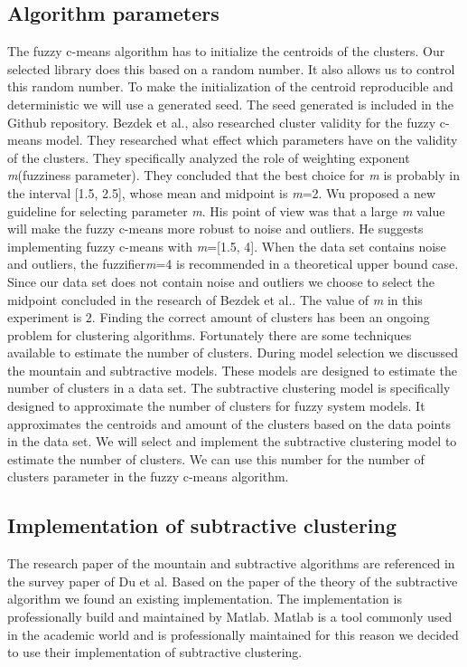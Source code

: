 \documentclass[../../main]{subfiles}
\begin{document}
\subsection{Algorithm parameters}
The fuzzy c-means algorithm has to initialize the centroids of the clusters.
Our selected library does this based on a random number.
It also allows us to control this random number.
To make the initialization of the centroid reproducible and deterministic we will use a generated seed.
The seed generated is included in the Github repository\cite{rbasarat-repo}.
\newline
Bezdek et al., also researched cluster validity for the fuzzy c-means model\cite{Bezdek1995OnModel}.
They researched what effect which parameters have on the validity of the clusters.
They specifically analyzed the role of weighting exponent \textit{m}(fuzziness parameter).
They concluded that the best choice for \textit{m} is probably in the interval [1.5, 2.5], whose mean and midpoint is \textit{m}=2.
Wu proposed a new guideline for selecting parameter \textit{m}\cite{Wu2012}.
His point of view was that a large \textit{m} value will make the fuzzy c-means more robust to noise and outliers.
He suggests implementing fuzzy c-means with \textit{m}=[1.5, 4].
When the data set contains noise and outliers, the fuzzifier\textit{m}=4 is recommended in a theoretical upper bound case.
Since our data set does not contain noise and outliers we choose to select the midpoint concluded in the research of Bezdek et al.\cite{Bezdek1995OnModel}.
The value of \textit{m} in this experiment is 2.
\newline
Finding the correct amount of clusters has been an ongoing problem for clustering algorithms\cite{Du2010Clustering:Approach}.
Fortunately there are some techniques available to estimate the number of clusters.
During model selection we discussed the mountain and subtractive models. 
These models are designed to estimate the number of clusters in a data set.
The subtractive clustering model is specifically designed to approximate the number of clusters for fuzzy system models\cite{Chiu1994FuzzyEstimation}.
It approximates the centroids and amount of the clusters based on the data points in the data set\cite{Chiu1994FuzzyEstimation}.
We will select and implement the subtractive clustering model to estimate the number of clusters.
We can use this number for the number of clusters parameter in the fuzzy c-means algorithm.

\subsection{Implementation of subtractive clustering}
The research paper of the mountain and subtractive algorithms are referenced in the survey paper of Du et al\cite{Du2010Clustering:Approach}.
Based on the paper of the theory of the subtractive algorithm\cite{Chiu1994FuzzyEstimation} we found an existing implementation\cite{matlabSubtractive}.
The implementation is professionally build and maintained by Matlab\cite{matlabSubtractive}.
Matlab is a tool commonly used in the academic world and is professionally maintained for this reason we decided to use their implementation of subtractive clustering.
\end{document}
